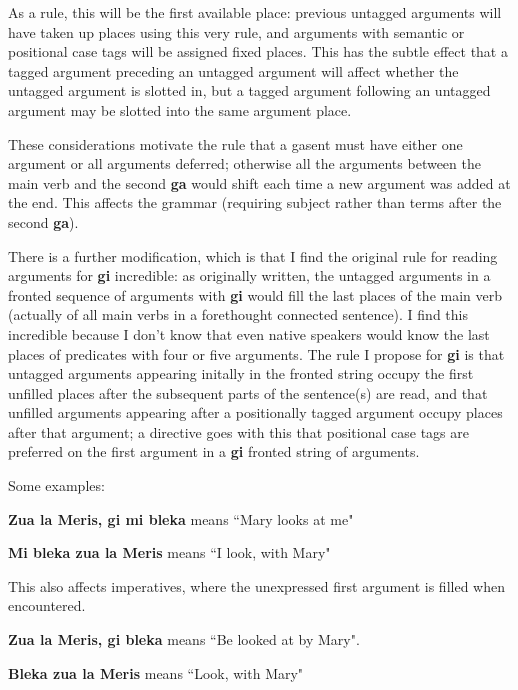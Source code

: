 \documentclass[12pt]{book}
\begin{document}
{As a rule, this will be the first available place:  previous untagged arguments will have taken up places using this very rule, and arguments with semantic or positional case tags will be assigned fixed places.  This has the subtle effect that
a tagged argument preceding an untagged argument will affect whether the untagged argument is slotted in, but a tagged argument following an untagged argument may be slotted into the same argument place.

These considerations motivate the rule that a gasent must have either one argument or all arguments deferred;
otherwise all the arguments between the main verb and the second {\bf ga} would shift each time a new argument was added at the end.  This affects the grammar (requiring subject rather than terms after the second {\bf ga}).

There is a further modification, which is that I find the original rule for reading arguments for {\bf gi} incredible:  as originally written, the untagged arguments in a fronted sequence of arguments with {\bf gi} would fill the last places of the main verb
(actually of all main verbs in a forethought connected sentence).  I find this incredible because I don't know that even native speakers would know the last places of predicates with four or five arguments.  The rule I propose for {\bf gi} is that  untagged arguments appearing initally in the fronted string occupy the first unfilled places after the subsequent parts of the sentence(s) are read, and that unfilled arguments appearing after a positionally tagged argument occupy places after that argument;  a directive goes with this that positional case tags are preferred on the first argument in a {\bf gi} fronted string of arguments.

Some examples:

{\bf Zua la Meris, gi mi bleka} means ``Mary looks at me"

{\bf Mi bleka zua la Meris} means ``I look, with Mary"

This also affects imperatives, where the unexpressed first argument is filled when encountered.

{\bf Zua la Meris, gi bleka} means ``Be looked at by Mary".

{\bf Bleka zua la Meris} means ``Look, with Mary"

}
\end{document}
